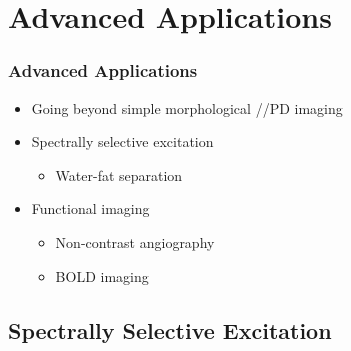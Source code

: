 



\section{Advanced Applications} %
\label{sec:advanced_applications}

\begin{frame}
	\frametitle{Advanced Applications}
	
	\begin{itemize}
		\item Going beyond simple morphological \longtime{}/\transtime{}/PD imaging
		\item Spectrally selective excitation
		\begin{itemize}
			\item Water-fat separation
		\end{itemize}
		\item Functional imaging
		\begin{itemize}
			\item Non-contrast angiography
			\item BOLD imaging
		\end{itemize}
	\end{itemize}
\end{frame}

\subsection{Spectrally Selective Excitation} %
\label{sub:spectrally_selective_excitation}

	
	
